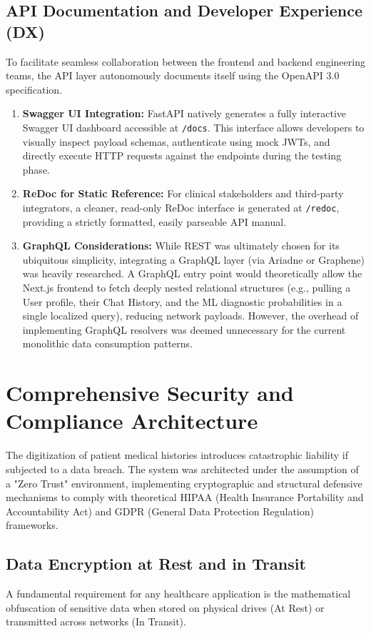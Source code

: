 \documentclass[12pt]{article}
\begin{document}
\subsection{API Documentation and Developer Experience (DX)}
To facilitate seamless collaboration between the frontend and backend engineering teams, the API layer autonomously documents itself using the OpenAPI 3.0 specification.
\begin{enumerate}
    \item \textbf{Swagger UI Integration:} FastAPI natively generates a fully interactive Swagger UI dashboard accessible at \texttt{/docs}. This interface allows developers to visually inspect payload schemas, authenticate using mock JWTs, and directly execute HTTP requests against the endpoints during the testing phase.
    \item \textbf{ReDoc for Static Reference:} For clinical stakeholders and third-party integrators, a cleaner, read-only ReDoc interface is generated at \texttt{/redoc}, providing a strictly formatted, easily parseable API manual.
    \item \textbf{GraphQL Considerations:} While REST was ultimately chosen for its ubiquitous simplicity, integrating a GraphQL layer (via Ariadne or Graphene) was heavily researched. A GraphQL entry point would theoretically allow the Next.js frontend to fetch deeply nested relational structures (e.g., pulling a User profile, their Chat History, and the ML diagnostic probabilities in a single localized query), reducing network payloads. However, the overhead of implementing GraphQL resolvers was deemed unnecessary for the current monolithic data consumption patterns.
\end{enumerate}

\newpage
\section{Comprehensive Security and Compliance Architecture}

The digitization of patient medical histories introduces catastrophic liability if subjected to a data breach. The system was architected under the assumption of a "Zero Trust" environment, implementing cryptographic and structural defensive mechanisms to comply with theoretical HIPAA (Health Insurance Portability and Accountability Act) and GDPR (General Data Protection Regulation) frameworks.

\subsection{Data Encryption at Rest and in Transit}
A fundamental requirement for any healthcare application is the mathematical obfuscation of sensitive data when stored on physical drives (At Rest) or transmitted across networks (In Transit).
\end{document}
